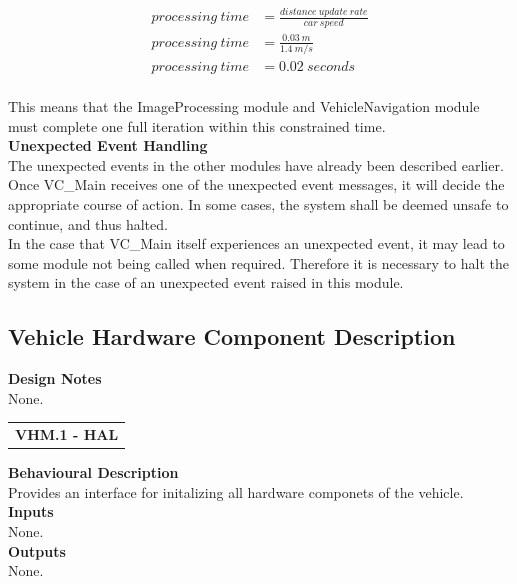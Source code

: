 \documentclass [10pt]{article}
\newcommand{\carSpeed}{1.4\ m/s}
\begin{document}
  
    \begin{align*}
     processing\ time & = \frac{distance\ update\ rate}{car\ speed} \\
     processing\ time & = \frac{0.03\ m}{\carSpeed} \\
     processing\ time & = 0.02\ seconds\\
    \end{align*}

 
This means that the ImageProcessing module and VehicleNavigation module must complete  one full iteration within this constrained time. \\

\textbf{Unexpected Event Handling}\\
    The unexpected events in the other modules have already been described earlier. Once VC\_Main receives one of the unexpected event messages, it will decide the appropriate course of action.  In some cases, the system shall be deemed unsafe to continue, and thus halted. \\
    In the case that VC\_Main itself experiences an unexpected event, it may lead to some module not being called when required. Therefore it is necessary to halt the system in the case of an unexpected event raised in this module.


\subsection{Vehicle Hardware Component Description}

\textbf{Design Notes} \\
None. \\

\begin{longtable}{p{}}
\rowcolor{tableCell}\textbf{VHM.1 - HAL} \\
\end{longtable}
\textbf{Behavioural Description} \\
    Provides an interface for initalizing all hardware componets of the vehicle.\\

\textbf{Inputs} \\ None.
 \\

\textbf{Outputs} \\
None. \\

\end{document}
